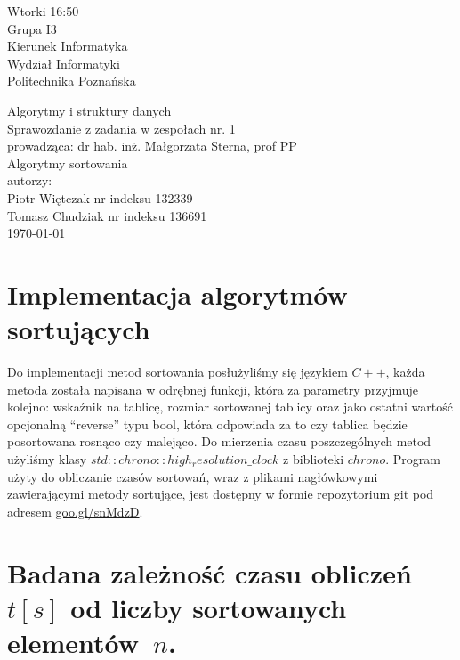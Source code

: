 \documentclass[polish,polish,a4paper]{article}
\begin{document}
	
\begin{spacing}{1.5}
		\begin{titlepage}
			\begin{flushright}
				{ Wtorki 16:50\\
					Grupa I3\\
					Kierunek Informatyka\\
					Wydział Informatyki\\
					Politechnika Poznańska}
			\end{flushright}
		\vspace*{\fill}
		\begin{center}
			{\Large Algorytmy i struktury danych \\[0.1cm]
				Sprawozdanie z zadania w zespołach nr. 1\\[0.1cm]
				prowadząca: dr hab. inż. Małgorzata Sterna, prof PP}\\
			{\Huge Algorytmy sortowania\\ [0.4cm]}
			{\large autorzy:\\[0.1cm]}
			{\large Piotr Więtczak nr indeksu 132339\\[0.1cm] Tomasz Chudziak nr indeksu 136691}\\[0.5cm]
			\today
		\end{center}
		\vspace*{\fill}
	\end{titlepage}
	
	\section{Implementacja algorytmów sortujących}
	Do implementacji metod sortowania posłużyliśmy się językiem $ C++ $, każda metoda została napisana  w odrębnej  funkcji, która za parametry przyjmuje kolejno: wskaźnik na tablicę, rozmiar sortowanej tablicy oraz jako ostatni wartość opcjonalną “reverse” typu bool, która odpowiada za to czy tablica będzie posortowana rosnąco czy malejąco. Do mierzenia czasu poszczególnych metod użyliśmy klasy $ std::chrono::high_resolution\_clock  $ z biblioteki $ chrono $. Program użyty do obliczanie czasów sortowań, wraz z plikami nagłówkowymi zawierającymi metody sortujące, jest dostępny w formie repozytorium git pod adresem \hyperref{goo.gl/snMdzD}{}{}{goo.gl/snMdzD}.
	\section{Badana zależność czasu obliczeń $ t[s]$ od liczby sortowanych elementów~$ n $. }
	

\end{spacing}
\end{document}
